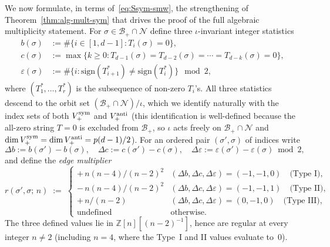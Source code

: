 \documentclass{amsart}
\theoremstyle{definition}
\theoremstyle{remark}
\begin{document}
We now formulate, in terms of~\eqref{eq:Ssym-smw}, the
strengthening of Theorem~\ref{thm:alg-mult-sym} that
drives the proof of the full algebraic multiplicity statement.
For $\sigma \in \mathcal{B}_+ \cap \mathcal{N}$ define three
$\iota$-invariant integer statistics
\begin{align*}
  b(\sigma) &:= \#\{i \in [1, d-1] : T_i(\sigma) = 0\}, \\
  c(\sigma) &:= \max\{k \ge 0 :
        T_{d-1}(\sigma) = T_{d-2}(\sigma) = \cdots
                       = T_{d-k}(\sigma) = 0\}, \\
  \varepsilon(\sigma) &:= \#\{i :
        \mathrm{sign}(T_{i+1}^{*}) \neq \mathrm{sign}(T_i^{*})\}
        \mod 2,
\end{align*}
where $(T_1^*, \ldots, T_r^*)$ is the subsequence of non-zero
$T_i$'s.  All three statistics descend to the orbit set
$(\mathcal{B}_+ \cap \mathcal{N})/\iota$, which we identify
naturally with the index sets of both $V_+^{\rm sym}$ and
$V_+^{\rm anti}$ (this identification is well-defined because
the all-zero string $T = 0$ is excluded from $\mathcal{B}_+$,
so $\iota$ acts freely on $\mathcal{B}_+ \cap \mathcal{N}$ and
$\dim V_+^{\rm sym} = \dim V_+^{\rm anti} = p(d-1)/2$).
For an ordered pair $(\sigma', \sigma)$ of indices write
\[
  \Delta b := b(\sigma') - b(\sigma), \quad
  \Delta c := c(\sigma') - c(\sigma), \quad
  \Delta\varepsilon := \varepsilon(\sigma') - \varepsilon(\sigma)
     \bmod 2,
\]
and define the \emph{edge multiplier}
\begin{equation}\label{eq:multiplier-r}
  r(\sigma', \sigma;\, n)
  \;:=\;
  \begin{cases}
    +\,n(n-4)/(n-2)^2 & (\Delta b, \Delta c, \Delta\varepsilon) = (-1, -1, 0)
        \quad\text{(Type~I)}, \\
    -\,n(n-4)/(n-2)^2 & (\Delta b, \Delta c, \Delta\varepsilon) = (-1, -1, 1)
        \quad\text{(Type~II)}, \\
    +\,n/(n-2)        & (\Delta b, \Delta c, \Delta\varepsilon) = (0,  -1, 0)
        \quad\text{(Type~III)}, \\
    \text{undefined}  & \text{otherwise.}
  \end{cases}
\end{equation}
The three defined values lie in $\mathbb Z[n][(n-2)^{-1}]$,
hence are regular at every integer $n \ne 2$ \textup{(}including
$n = 4$, where the Type~I and II values evaluate to~$0$\textup{)}.
\end{document}
